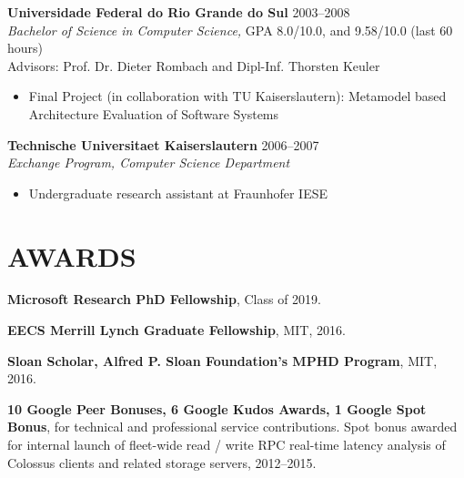 \documentclass[line,margin]{res}
\begin{document}
\begin{resume}
  \textbf{Universidade Federal do Rio Grande do Sul} \hfill 2003--2008 \\
  {\sl Bachelor of Science in Computer Science,} GPA 8.0/10.0, and 9.58/10.0 (last 60 hours) \\
  Advisors: Prof. Dr. Dieter Rombach and Dipl-Inf. Thorsten Keuler
  \begin{itemize}  \itemsep -2pt
  \item  Final Project (in collaboration with TU Kaiserslautern): Metamodel based Architecture Evaluation of Software Systems
  \end{itemize}

  \textbf{Technische Universitaet Kaiserslautern} \hfill 2006--2007 \\
  {\sl Exchange Program, Computer Science Department}
  \begin{itemize}  \itemsep -2pt
  \item  Undergraduate research assistant at Fraunhofer IESE
  \end{itemize}

%

\section{AWARDS}

\textbf{Microsoft Research PhD Fellowship}, Class of 2019.

\textbf{EECS Merrill Lynch Graduate Fellowship}, MIT, 2016.


\textbf{Sloan Scholar, Alfred P. Sloan Foundation's MPHD Program}, MIT, 2016.

\textbf{10 Google Peer Bonuses, 6 Google Kudos Awards, 1 Google Spot Bonus}, for technical and professional service contributions.  Spot bonus awarded for internal launch of fleet-wide read / write RPC real-time latency analysis of Colossus clients and related storage servers, 2012--2015.


\end{resume}
\end{document}
